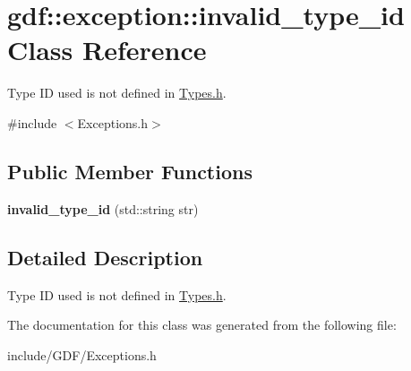\hypertarget{classgdf_1_1exception_1_1invalid__type__id}{
\section{gdf::exception::invalid\_\-type\_\-id Class Reference}
\label{classgdf_1_1exception_1_1invalid__type__id}
}


Type ID used is not defined in \hyperlink{_types_8h_source}{Types.h}.  




{\ttfamily \#include $<$Exceptions.h$>$}

\subsection*{Public Member Functions}
\begin{DoxyCompactItemize}
\item 
\hypertarget{classgdf_1_1exception_1_1invalid__type__id_a2bfa052162e285ba621cae88068f3783}{
{\bfseries invalid\_\-type\_\-id} (std::string str)}
\label{classgdf_1_1exception_1_1invalid__type__id_a2bfa052162e285ba621cae88068f3783}

\end{DoxyCompactItemize}


\subsection{Detailed Description}
Type ID used is not defined in \hyperlink{_types_8h_source}{Types.h}. 

The documentation for this class was generated from the following file:\begin{DoxyCompactItemize}
\item 
include/GDF/Exceptions.h\end{DoxyCompactItemize}

